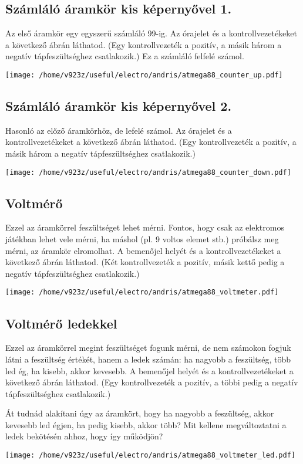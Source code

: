 \documentclass[16pt]{scrreprt}
\begin{document}
\subsection{Számláló áramkör kis képernyővel 1.}

Az első áramkör egy egyszerű számláló 99-ig. Az órajelet és a kontrollvezetékeket a következő ábrán láthatod. (Egy 
kontrollvezeték a pozitív, a másik három a negatív tápfeszültséghez csatlakozik.) Ez a számláló felfelé számol. 

\texttt{[image: /home/v923z/useful/electro/andris/atmega88\_counter\_up.pdf]}

\subsection{Számláló áramkör kis képernyővel 2.}

Hasonló az előző áramkörhöz, de lefelé számol. Az órajelet és a kontrollvezetékeket a következő ábrán láthatod. 
(Egy kontrollvezeték a pozitív, a másik három a negatív tápfeszültséghez csatlakozik.)

\texttt{[image: /home/v923z/useful/electro/andris/atmega88\_counter\_down.pdf]}

\subsection{Voltmérő}

Ezzel az áramkörrel feszültséget lehet mérni. Fontos, hogy csak az elektromos játékban lehet vele mérni, ha máshol (pl. 
9 voltos elemet stb.) próbálsz meg mérni, az áramkör elromolhat. A bemenőjel helyét és a kontrollvezetékeket a 
következő ábrán láthatod. (Két kontrollvezeték a pozitív, másik kettő pedig a negatív tápfeszültséghez csatlakozik.)

\texttt{[image: /home/v923z/useful/electro/andris/atmega88\_voltmeter.pdf]}

\subsection{Voltmérő ledekkel}

Ezzel az áramkörrel megint feszültséget fogunk mérni, de nem számokon fogjuk látni a feszültség értékét, hanem a ledek 
számán: ha nagyobb a feszültség, több led ég, ha kisebb, akkor kevesebb. A bemenőjel helyét és a kontrollvezetékeket a 
következő ábrán láthatod. (Egy kontrollvezeték a pozitív, a többi pedig a negatív tápfeszültséghez csatlakozik.)

Át tudnád alakítani úgy az áramkört, hogy ha nagyobb a feszültség, akkor kevesebb led égjen, ha pedig kisebb, akkor 
több? Mit kellene megváltoztatni a ledek bekötésén ahhoz, hogy így működjön?

\texttt{[image: /home/v923z/useful/electro/andris/atmega88\_voltmeter\_led.pdf]}
\end{document}
